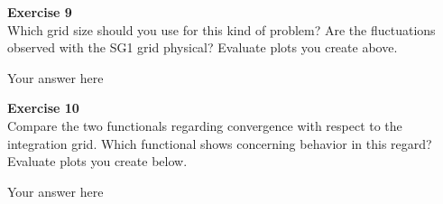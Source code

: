 \documentclass{article}
\begin{document}
\begin{mdframed}
\textbf{Exercise 9}\\
Which grid size should you use for this kind of problem? Are the fluctuations observed with the SG1 grid physical? Evaluate plots you create above.
\end{mdframed}

Your answer here

\begin{mdframed}
\textbf{Exercise 10}\\
Compare the two functionals regarding convergence with respect to the integration grid. Which functional shows concerning behavior in this regard? Evaluate plots you create below.
\end{mdframed}

Your answer here
\end{document}

